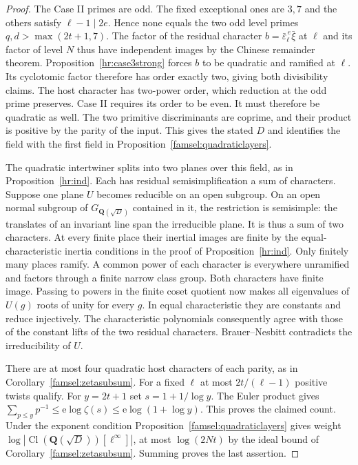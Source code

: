 \begin{proof}
The Case II primes are odd. The fixed exceptional ones are \(3,7\)
and the others satisfy \(\ell-1\mid2e\). Hence none equals the two
odd level primes \(q,d>\max(2t+1,7)\). The factor of the residual
character \(b=\bar\varepsilon_\ell^{\,e}\bar\xi\) at \(\ell\)
and its factor of level \(N\) thus have independent images by the
Chinese remainder theorem. Proposition~\ref{hr:case3strong} forces
\(b\) to be quadratic and ramified at \(\ell\). Its cyclotomic factor
therefore has order exactly two, giving both divisibility claims.
The host character has two-power order, which reduction at the odd
prime preserves. Case II requires its order to be even. It must
therefore be quadratic as well. The two primitive discriminants
are coprime, and their product is positive by the parity of the
input. This gives the stated \(D\) and identifies the field with
the first field in Proposition~\ref{famsel:quadraticlayers}.

The quadratic intertwiner splits into two planes over this field,
as in Proposition~\ref{hr:ind}. Each has residual semisimplification
a sum of characters. Suppose one plane \(U\) becomes reducible on
an open subgroup. On an open normal subgroup of \(G_{\mathbf Q(\sqrt D)}\)
contained in it, the restriction is semisimple: the translates of
an invariant line span the irreducible plane. It is thus a sum of
two characters. At every finite place their inertial images are
finite by the equal-characteristic inertia conditions in the proof
of Proposition~\ref{hr:ind}. Only finitely many places ramify.
A common power of each character is everywhere unramified and
factors through a finite narrow class group. Both characters have
finite image. Passing to powers in the finite coset quotient now
makes all eigenvalues of \(U(g)\) roots of unity for every \(g\).
In equal characteristic they are constants and reduce injectively.
The characteristic polynomials consequently agree with those of
the constant lifts of the two residual characters. Brauer--Nesbitt
contradicts the irreducibility of \(U\).

There are at most four quadratic host characters of each parity,
as in Corollary~\ref{famsel:zetasubsum}. For a fixed \(\ell\) at
most \(2t/(\ell-1)\) positive twists qualify.
For \(y=2t+1\) set \(s=1+1/\log y\). The Euler product gives
\(\sum_{p\le y}p^{-1}\le\mathrm e\log\zeta(s)
\le\mathrm e\log(1+\log y)\). This proves the claimed count.
Under the exponent condition Proposition~\ref{famsel:quadraticlayers}
gives weight \(\log|\operatorname{Cl}(\mathbf Q(\sqrt D))[\ell^\infty]|\),
at most \(\log(2Nt)\) by the ideal bound of
Corollary~\ref{famsel:zetasubsum}. Summing proves the last assertion.
\end{proof}

